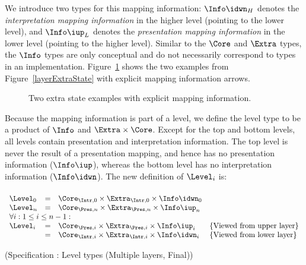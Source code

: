 We introduce two types for this mapping information: $\Info\idwn_{H}$ denotes the {\em interpretation mapping information} in the higher level (pointing to the lower level), and $\Info\iup_{L}$ denotes the {\em presentation mapping information} in the lower level (pointing to the higher level). Similar to the $\Core$ and $\Extra$ types, the $\Info$ types are only conceptual and do not necessarily correspond to types in an implementation. Figure~\ref{coreExtraInfoExamples} shows the two examples from Figure~\ref{layerExtraState} with explicit mapping information arrows. 

\begin{figure}
\begin{center}
\begin{center}
\end{center}
\caption{Two extra state examples with explicit mapping information.}\label{coreExtraInfoExamples} 
\end{center}
\end{figure}

Because the mapping information is part of a level, we define the level type to be a product of $\Info$ and 
$\Extra \times \Core$. Except for the top and bottom levels, all levels contain presentation and interpretation information. The top level is never the result of a presentation mapping, and hence has no presentation information ($\Info\iup$), whereas the bottom level has no interpretation information ($\Info\idwn$). The new definition of $\Level_i$ is:

\begin{small}
 \label{spec:levelMultiFinal}
\begin{align*}%
\end{align*} 
\(\begin{array}{lcll}
\Level_{0} & = & \Core_{\Intr,0} \times \Extra_{\Intr,0} \times \Info\idwn_{0} \\
\Level_{n} & = & \Core_{\Pres,n} \times \Extra_{\Pres,n} \times  \Info\iup_{n}\\
\lefteqn{\forall i:1 \le i \le n-1:}  \\
\Level_{i} & = & \Core_{\Pres,i} \times \Extra_{\Pres,i}  \times \Info\iup_{i} & \text{\{Viewed from upper layer\}}\\  
               & = & \Core_{\Intr,i} \times \Extra_{\Intr,i} \times \Info\idwn_{i} & \text{\{Viewed from lower layer\}}
\end{array}\)\end{small}
\begin{center}(Specification \thespecification: Level types (Multiple layers, Final))\end{center}\vspace{1em}

